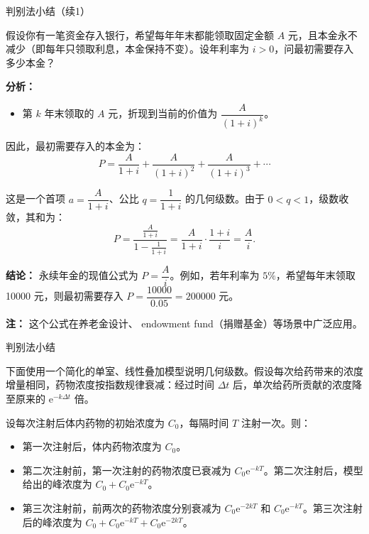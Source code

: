 \documentclass[aspectratio=169,10pt,fontset=fandol]{ctexbeamer}
\newcommand{\ee}{\mathrm{e}}
\begin{document}
\begin{frame}[t,fragile]{判别法小结（续1）}
\footnotesize
{\footnotesize
\begin{application}

假设你有一笔资金存入银行，希望每年年末都能领取固定金额 \(A\) 元，且本金永不减少（即每年只领取利息，本金保持不变）。设年利率为 \(i>0\)，问最初需要存入多少本金？

\textbf{分析：}
\begin{itemize}

\item 第 \(k\) 年末领取的 \(A\) 元，折现到当前的价值为 \(\dfrac{A}{(1+i)^k}\)。
\end{itemize}

因此，最初需要存入的本金为：
\[
P = \frac{A}{1+i} + \frac{A}{(1+i)^2} + \frac{A}{(1+i)^3} + \cdots
\]

这是一个首项 \(a=\dfrac{A}{1+i}\)、公比 \(q=\dfrac{1}{1+i}\) 的几何级数。由于 \(0<q<1\)，级数收敛，其和为：
\[
P=\frac{\frac{A}{1+i}}{1-\frac{1}{1+i}}
=\frac{A}{1+i}\cdot\frac{1+i}{i}
=\frac{A}{i}.
\]

\textbf{结论：} 永续年金的现值公式为 \(P=\dfrac{A}{i}\)。例如，若年利率为 \(5\%\)，希望每年末领取 10000 元，则最初需要存入 \(P=\dfrac{10000}{0.05}=200000\) 元。

\textbf{注：} 这个公式在养老金设计、 endowment fund（捐赠基金）等场景中广泛应用。
\end{application}
}
\end{frame}
\begin{frame}[t,fragile]{判别法小结}
\normalsize
{\normalsize
\begin{application}

下面使用一个简化的单室、线性叠加模型说明几何级数。假设每次给药带来的浓度增量相同，药物浓度按指数规律衰减：经过时间 \(\Delta t\) 后，单次给药所贡献的浓度降至原来的 \(\ee^{-k\Delta t}\) 倍。

设每次注射后体内药物的初始浓度为 \(C_0\)，每隔时间 \(T\) 注射一次。则：
\begin{itemize}
\item 第一次注射后，体内药物浓度为 \(C_0\)。
\item 第二次注射前，第一次注射的药物浓度已衰减为 \(C_0\ee^{-kT}\)。第二次注射后，模型给出的峰浓度为 \(C_0+C_0\ee^{-kT}\)。
\item 第三次注射前，前两次的药物浓度分别衰减为 \(C_0\ee^{-2kT}\) 和 \(C_0\ee^{-kT}\)。第三次注射后的峰浓度为 \(C_0+C_0\ee^{-kT}+C_0\ee^{-2kT}\)。

\end{itemize}\end{application}
}
\end{frame}
\end{document}
